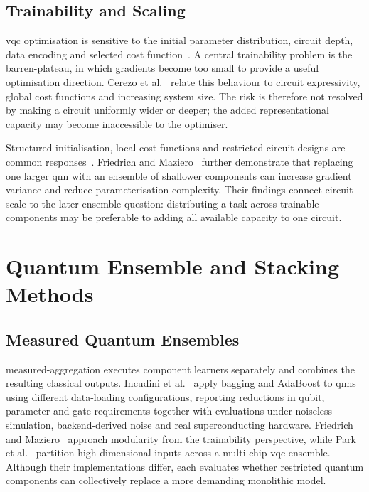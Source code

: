 \documentclass[]{UCD_CS_MSc_AAI_Report}
\begin{document}
\subsection{Trainability and Scaling}
\ac{vqc} optimisation is sensitive to the initial parameter distribution, circuit depth, data encoding and selected cost function~\cite{vasan_exploring_2025,friedrich_quantum_2025}. A central trainability problem is the \gls{barren-plateau}, in which gradients become too small to provide a useful optimisation direction. Cerezo et al.~\cite{cerezo_challenges_2022} relate this behaviour to circuit expressivity, global cost functions and increasing system size. The risk is therefore not resolved by making a circuit uniformly wider or deeper; the added representational capacity may become inaccessible to the optimiser.

Structured initialisation, local cost functions and restricted circuit designs are common responses~\cite{du_quantum_2025}. Friedrich and Maziero~\cite{friedrich_quantum_2025} further demonstrate that replacing one larger \ac{qnn} with an ensemble of shallower components can increase gradient variance and reduce parameterisation complexity. Their findings connect circuit scale to the later ensemble question: distributing a task across trainable components may be preferable to adding all available capacity to one circuit.

\section{Quantum Ensemble and Stacking Methods}
\label{sec:rw-quantum-ensembles}

\subsection{Measured Quantum Ensembles}
\Gls{measured-aggregation} executes component learners separately and combines the resulting classical outputs. Incudini et al.~\cite{incudini_resource_2023} apply bagging and AdaBoost to \acp{qnn} using different data-loading configurations, reporting reductions in qubit, parameter and gate requirements together with evaluations under noiseless simulation, backend-derived noise and real superconducting hardware. Friedrich and Maziero~\cite{friedrich_quantum_2025} approach modularity from the trainability perspective, while Park et al.~\cite{park_addressing_2025} partition high-dimensional inputs across a multi-chip \ac{vqc} ensemble. Although their implementations differ, each evaluates whether restricted quantum components can collectively replace a more demanding monolithic model.
\end{document}
